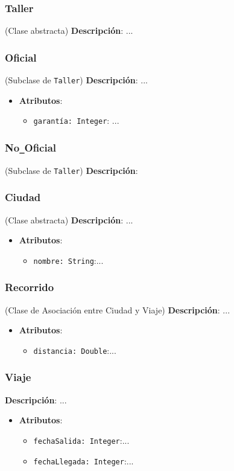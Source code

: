 \documentclass[12pt.a4paper]{article}
\begin{document}
\subsubsection{Taller} (Clase abstracta)
\textbf{Descripción}:  
...

\subsubsection{Oficial} (Subclase de \texttt{Taller})
\textbf{Descripción}:  
...
\begin{itemize}
    \item \textbf{Atributos}:
    \begin{itemize}
        \item \texttt{garantía: Integer}: ...
    \end{itemize}
\end{itemize}

\subsubsection{No\texttt{\_}Oficial} (Subclase de \texttt{Taller})
\textbf{Descripción}:  

\subsubsection{Ciudad} (Clase abstracta)
\textbf{Descripción}:  
...
\begin{itemize}
    \item \textbf{Atributos}:
    \begin{itemize}
        \item \texttt{nombre: String}:...
    \end{itemize}
\end{itemize}

\subsubsection{Recorrido} (Clase de Asociación entre Ciudad y Viaje)
\textbf{Descripción}:  
...
\begin{itemize}
    \item \textbf{Atributos}:
    \begin{itemize}
        \item \texttt{distancia: Double}:...
    \end{itemize}
\end{itemize}

\subsubsection{Viaje}
\textbf{Descripción}:  
...
\begin{itemize}
    \item \textbf{Atributos}:
    \begin{itemize}
        \item \texttt{fechaSalida: Integer}:...
        \item \texttt{fechaLlegada: Integer}:...
    \end{itemize}
\end{itemize}
\end{document}
